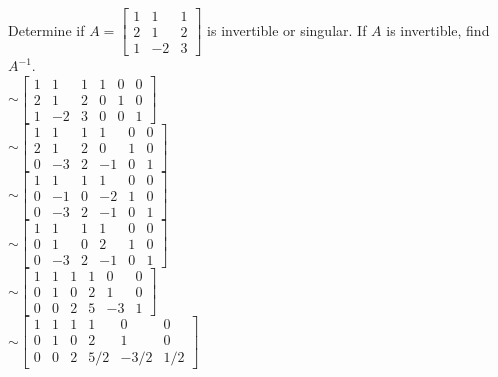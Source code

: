 \documentclass{report}
\begin{document}
\begin{example}
Determine if $A=
\begin{bmatrix}
	1 & 1 & 1 \\
	2 & 1 & 2 \\
	1 & -2 & 3
\end{bmatrix}$
is invertible or singular. If $A$ is invertible, find $A^{-1}$.\\\vspace{2mm}
$\sim\begin{bmatrix}
	1 & 1 & 1 & 1 & 0 & 0 \\
	2 & 1 & 2 & 0 & 1 & 0 \\
	1 & -2 & 3 & 0 & 0 & 1 
\end{bmatrix}$\\\vspace{2mm}
$\sim\begin{bmatrix}
	1 & 1 & 1 & 1 & 0 & 0 \\
	2 & 1 & 2 & 0 & 1 & 0 \\
	0 & -3 & 2 & -1 & 0 & 1 
\end{bmatrix}$\\\vspace{2mm}
$\sim\begin{bmatrix}
	1 & 1 & 1 & 1 & 0 & 0 \\
	0 & -1 & 0 & -2 & 1 & 0 \\
	0 & -3 & 2 & -1 & 0 & 1 
\end{bmatrix}$\\\vspace{2mm}
$\sim\begin{bmatrix}
	1 & 1 & 1 & 1 & 0 & 0 \\
	0 & 1 & 0 & 2 & 1 & 0 \\
	0 & -3 & 2 & -1 & 0 & 1 
\end{bmatrix}$\\\vspace{2mm}
$\sim\begin{bmatrix}
	1 & 1 & 1 & 1 & 0 & 0 \\
	0 & 1 & 0 & 2 & 1 & 0 \\
	0 & 0 & 2 & 5 & -3 & 1 
\end{bmatrix}$\\\vspace{2mm}
$\sim\begin{bmatrix}
	1 & 1 & 1 & 1 & 0 & 0 \\
	0 & 1 & 0 & 2 & 1 & 0 \\
	0 & 0 & 2 & 5/2 & -3/2 & 1/2 
\end{bmatrix}$\\\vspace{2mm}

\end{example}
\end{document}
